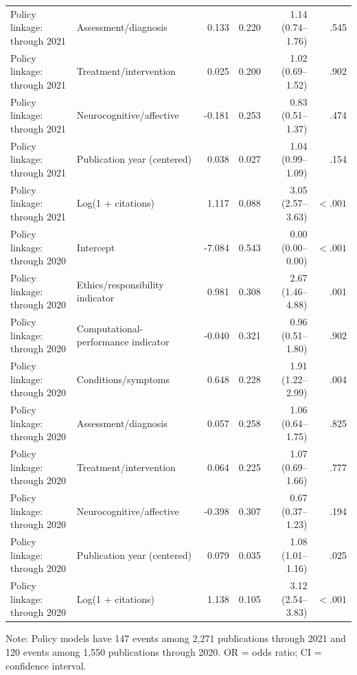 \documentclass[11pt]{article}
\begin{document}
\begin{longtable}{p{4.0cm}p{4.0cm}rrrr}
Policy linkage: through 2021 & Assessment/diagnosis & 0.133 & 0.220 & 1.14 (0.74--1.76) & .545 \\
Policy linkage: through 2021 & Treatment/intervention & 0.025 & 0.200 & 1.02 (0.69--1.52) & .902 \\
Policy linkage: through 2021 & Neurocognitive/affective & -0.181 & 0.253 & 0.83 (0.51--1.37) & .474 \\
Policy linkage: through 2021 & Publication year (centered) & 0.038 & 0.027 & 1.04 (0.99--1.09) & .154 \\
Policy linkage: through 2021 & Log(1 + citations) & 1.117 & 0.088 & 3.05 (2.57--3.63) & $<.001$ \\
Policy linkage: through 2020 & Intercept & -7.084 & 0.543 & 0.00 (0.00--0.00) & $<.001$ \\
Policy linkage: through 2020 & Ethics/responsibility indicator & 0.981 & 0.308 & 2.67 (1.46--4.88) & .001 \\
Policy linkage: through 2020 & Computational-performance indicator & -0.040 & 0.321 & 0.96 (0.51--1.80) & .902 \\
Policy linkage: through 2020 & Conditions/symptoms & 0.648 & 0.228 & 1.91 (1.22--2.99) & .004 \\
Policy linkage: through 2020 & Assessment/diagnosis & 0.057 & 0.258 & 1.06 (0.64--1.75) & .825 \\
Policy linkage: through 2020 & Treatment/intervention & 0.064 & 0.225 & 1.07 (0.69--1.66) & .777 \\
Policy linkage: through 2020 & Neurocognitive/affective & -0.398 & 0.307 & 0.67 (0.37--1.23) & .194 \\
Policy linkage: through 2020 & Publication year (centered) & 0.079 & 0.035 & 1.08 (1.01--1.16) & .025 \\
Policy linkage: through 2020 & Log(1 + citations) & 1.138 & 0.105 & 3.12 (2.54--3.83) & $<.001$ \\
\end{longtable}

\noindent\small Note: Policy models have 147 events among 2,271 publications through 2021 and 120 events among 1,550 publications through 2020. OR = odds ratio; CI = confidence interval.
\end{document}
